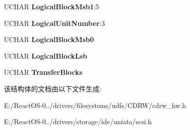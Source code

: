\begin{DoxyCompactItemize}
U\+C\+H\+AR {\bfseries Logical\+Block\+Msb1}\+:5
\item 
\mbox{\label{struct___c_d_b_1_1___c_d_b6_r_e_a_d_w_r_i_t_e_afc00c7545fc63b4d7bed80cca3f0e7b6}} 
U\+C\+H\+AR {\bfseries Logical\+Unit\+Number}\+:3
\item 
\mbox{\label{struct___c_d_b_1_1___c_d_b6_r_e_a_d_w_r_i_t_e_a3f86cfc8c7313b122e851f1a3ec0180a}} 
U\+C\+H\+AR {\bfseries Logical\+Block\+Msb0}
\item 
\mbox{\label{struct___c_d_b_1_1___c_d_b6_r_e_a_d_w_r_i_t_e_ac88adbcef818102be05ea112023db43c}} 
U\+C\+H\+AR {\bfseries Logical\+Block\+Lsb}
\item 
\mbox{\label{struct___c_d_b_1_1___c_d_b6_r_e_a_d_w_r_i_t_e_a33cfb66136c4cbef81d8c705a053b558}} 
U\+C\+H\+AR {\bfseries Transfer\+Blocks}
\end{DoxyCompactItemize}


该结构体的文档由以下文件生成\+:\begin{DoxyCompactItemize}
\item 
E\+:/\+React\+O\+S-\/0../drivers/filesystems/udfs/\+C\+D\+R\+W/cdrw\+\_\+hw.\+h\item 
E\+:/\+React\+O\+S-\/0../drivers/storage/ide/uniata/scsi.\+h\end{DoxyCompactItemize}
